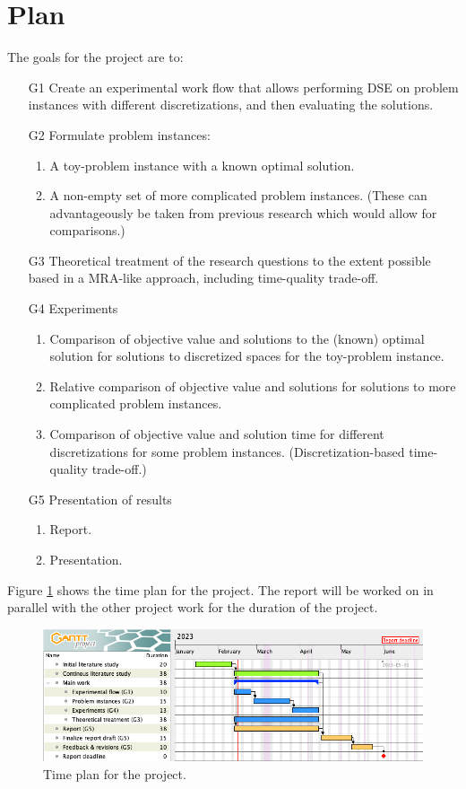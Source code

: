 \documentclass[12pt,notitlepage]{article}
\begin{document}
\section{Plan}
The goals for the project are to:
\begin{enumerate}
	\item[G1] Create an experimental work flow that allows performing DSE on problem instances with different discretizations, and then evaluating the solutions.
	\item[G2] Formulate problem instances:
	\begin{enumerate}
		\item A toy-problem instance with a known optimal solution.
		\item A non-empty set of more complicated problem instances. (These can advantageously be taken from previous research which would allow for comparisons.)
	\end{enumerate}
	\item[G3] Theoretical treatment of the research questions to the extent possible based in a MRA-like approach, including time-quality trade-off.
	\item[G4] Experiments
	\begin{enumerate}
		\item Comparison of objective value and solutions to the (known) optimal solution for solutions to discretized spaces for the toy-problem instance.
		\item Relative comparison of objective value and solutions for solutions to more complicated problem instances.
		\item Comparison of objective value and solution time for different discretizations for some problem instances. (Discretization-based time-quality trade-off.)
	\end{enumerate}
	 \item[G5] Presentation of results
	 \begin{enumerate}
	 	\item Report.
	 	\item Presentation.
	 \end{enumerate}
\end{enumerate}

\noindent Figure \ref{timeplan} shows the time plan for the project. The report will be worked on in parallel with the other project work for the duration of the project.

\begin{figure}[H]
	\centering
	\includegraphics[scale=0.5]{figures/timeline.png} 
	\caption{Time plan for the project.}
	\label{timeplan}
\end{figure}
\end{document}
